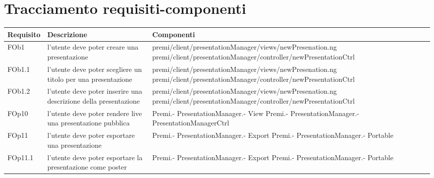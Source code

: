 \newpage
\section{Tracciamento requisiti-componenti}	
\begin{longtable}{|l|p{5cm}|p{7cm}|}
\hline
\textbf{Requisito}  & \textbf{Descrizione} & \textbf{Componenti} \\
\hline
FOb1 & l'utente deve poter creare una presentazione & \hspace{0pt}premi/client/presentationManager/views/newPresenation.ng \linebreak \linebreak premi/client/presentationManager/controller/newPresentationCtrl \\
\hline
FOb1.1 & l'utente deve poter scegliere un titolo per una presentazione & \hspace{0pt}premi/client/presentationManager/views/newPresenation.ng \linebreak \linebreak premi/client/presentationManager/controller/newPresentationCtrl \\
\hline
FOb1.2 & l'utente deve poter inserire una descrizione della presentazione & \hspace{0pt}premi/client/presentationManager/views/newPresenation.ng \linebreak \linebreak premi/client/presentationManager/controller/newPresentationCtrl \\
\hline
FOp10 & l'utente deve poter rendere live una presentazione pubblica & Premi.- \linebreak PresentationManager.- \linebreak View \linebreak Premi.- \linebreak PresentationManager.- \linebreak PresentationManagerCtrl \linebreak \\
\hline
FOp11 & l'utente deve poter esportare una presentazione & Premi.- \linebreak PresentationManager.- \linebreak Export \linebreak Premi.- \linebreak PresentationManager.- \linebreak Portable \linebreak \\
\hline
FOp11.1 & l'utente deve poter esportare la presentazione come poster & Premi.- \linebreak PresentationManager.- \linebreak Export \linebreak Premi.- \linebreak PresentationManager.- \linebreak Portable \linebreak \\

\end{longtable}
